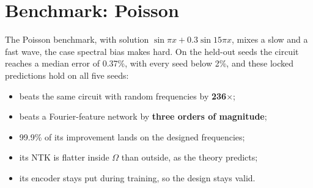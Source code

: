 \newpart
\section{Benchmark: Poisson}
The Poisson benchmark, with solution $\sin\pi x + 0.3\sin15\pi x$, mixes a slow and a
fast wave, the case spectral bias makes hard. On the held-out seeds the circuit reaches a
median error of 0.37\%, with every seed below 2\%, and these locked predictions hold on
all five seeds:
\begin{itemize}
  \item beats the same circuit with random frequencies by \textbf{236$\times$};
  \item beats a Fourier-feature network by \textbf{three orders of magnitude};
  \item 99.9\% of its improvement lands on the designed frequencies;
  \item its NTK is flatter inside $\Omega$ than outside, as the theory predicts;
  \item its encoder stays put during training, so the design stays valid.
\end{itemize}
